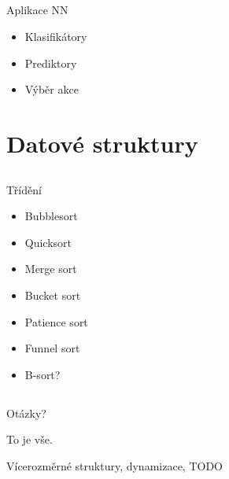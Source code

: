 \documentclass{beamer}
\begin{document}
\subsection{}
\begin{frame}{Aplikace NN}
\begin{itemize}
\item Klasifikátory
\item Prediktory
\item Výběr akce
\end{itemize}
\end{frame}

\subsection{}

\section{Datové struktury}

\subsection{}
\begin{frame}{Třídění}
\begin{itemize}
\item Bubblesort
\item Quicksort
\item Merge sort
\item Bucket sort
\item Patience sort
\item Funnel sort
\item B-sort?
\end{itemize}
\end{frame}

\subsection{}
\begin{frame}{Otázky?}
\begin{center}
To je vše.

Vícerozměrné struktury, dynamizace, TODO
\end{center}
\end{frame}
\end{document}
